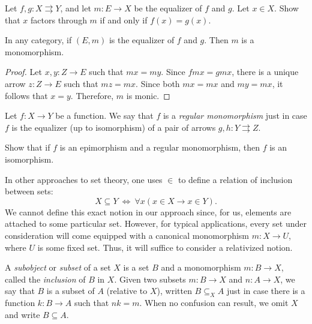 \begin{exercise} Let $f,g:X\rightrightarrows Y$, and let $m:E\to X$ be
  the equalizer of $f$ and $g$.  Let $x\in X$.  Show that $x$ factors
  through $m$ if and only if $f(x)=g(x)$. \end{exercise}

\begin{prop} In any category, if $(E,m)$ is the equalizer of $f$ and
  $g$.  Then $m$ is a monomorphism. \end{prop}

\begin{proof} Let $x,y:Z\to E$ such that $mx=my$.  Since $fmx=gmx$,
  there is a unique arrow $z:Z\to E$ such that $mz=mx$.  Since both
  $mx=mx$ and $my=mx$, it follows that $x=y$.  Therefore, $m$ is
  monic. \end{proof}

\begin{defn} Let $f:X\to Y$ be a function.  We say that $f$ is a
  \emph{regular monomorphism} just in case $f$ is the equalizer (up to
  isomorphism) of a pair of arrows $g,h:Y\rightrightarrows
  Z$. \end{defn}

\begin{exercise} Show that if $f$ is an epimorphism and a regular
  monomorphism, then $f$ is an
  isomorphism. \label{herman} \end{exercise}



In other approaches to set theory, one uses $\in$ to define a relation
of inclusion between sets:
\[ X\subseteq Y \: \Longleftrightarrow \: \forall x(x\in X\to x\in Y )
.\] We cannot define this exact notion in our approach since, for us,
elements are attached to some particular set.  However, for typical
applications, every set under consideration will come equipped with a
canonical monomorphism $m:X\to U$, where $U$ is some fixed set.  Thus,
it will suffice to consider a relativized notion.

\begin{defn} A \emph{subobject} or \emph{subset} of a set $X$ is a set
  $B$ and a monomorphism $m:B\to X$, called the \emph{inclusion} of
  $B$ in $X$.  Given two subsets $m:B\to X$ and $n:A\to X$, we say
  that $B$ is a subset of $A$ (relative to $X$), written $B\subseteq
  _X A$ just in case there is a function $k:B\to A$ such that $nk=m$.
  When no confusion can result, we omit $X$ and write $B\subseteq
  A$.  \end{defn}

